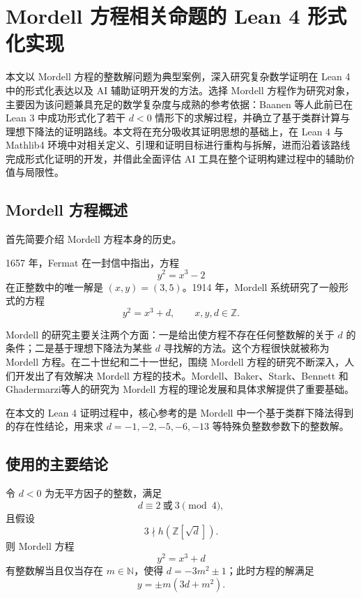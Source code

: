 \newpage
{}
\section{Mordell 方程相关命题的 Lean 4 形式化实现}

本文以 Mordell 方程的整数解问题为典型案例，深入研究复杂数学证明在 Lean 4 中的形式化表达以及 AI 辅助证明开发的方法。选择 Mordell 方程作为研究对象，主要因为该问题兼具充足的数学复杂度与成熟的参考依据：Baanen 等人此前已在 Lean 3 中成功形式化了若干 \(d < 0\) 情形下的求解过程，并确立了基于类群计算与理想下降法的证明路线\cite{Baanen2023MordellLean}。本文将在充分吸收其证明思想的基础上，在 Lean 4 与 Mathlib4 环境中对相关定义、引理和证明目标进行重构与拆解，进而沿着该路线完成形式化证明的开发，并借此全面评估 AI 工具在整个证明构建过程中的辅助价值与局限性。

\subsection{Mordell 方程概述}

首先简要介绍 Mordell 方程本身的历史。

1657 年，Fermat 在一封信中指出，方程
\[
y^2=x^3-2
\]
在正整数中的唯一解是 \((x,y)=(3,5)\)\cite{Fermat1894}。1914 年，Mordell\cite{Mordell1914} 系统研究了一般形式的方程
\[
y^2=x^3+d,\qquad x,y,d\in\mathbb{Z}.
\]

Mordell 的研究主要关注两个方面：一是给出使方程不存在任何整数解的关于 \(d\) 的条件；二是基于理想下降法为某些 \(d\) 寻找解的方法。这个方程很快就被称为 Mordell 方程。在二十世纪和二十一世纪，围绕 Mordell 方程的研究不断深入，人们开发出了有效解决 Mordell 方程的技术。Mordell\cite{Mordell1914,Mordell1920,Mordell1969}、Baker\cite{Baker1968}、Stark\cite{Stark1973}、Bennett 和 Ghadermarzi\cite{Bennett2015}等人的研究为 Mordell 方程的理论发展和具体求解提供了重要基础。

在本文的 Lean 4 证明过程中，核心参考的是 Mordell\cite{Mordell1914} 中一个基于类群下降法得到的存在性结论，用来求 \(d=-1,-2,-5,-6,-13\) 等特殊负整数参数下的整数解。

\subsection{使用的主要结论}

\begin{theorem}[]\label{thm:mordell-basic}
令 \(d<0\) 为无平方因子的整数，满足
\[
d\equiv 2\ \text{或}\ 3 \pmod{4},
\]
且假设
\[
3\nmid h(\mathbb{Z}[\sqrt d]).
\]
则 Mordell 方程
\[
y^2=x^3+d
\]
有整数解当且仅当存在 \(m\in\mathbb{N}\)，使得 \(d=-3m^2\pm 1\)；此时方程的解满足
\[
y=\pm m(3d+m^2).
\]
\end{theorem}

